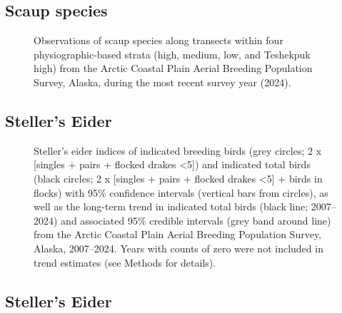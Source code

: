 \documentclass[
]{article}
\begin{document}
\endgroup{}

\newpage{}

\subsection*{Scaup species}\label{scaup-species-2}

\begin{figure}


\caption{\label{fig-UNSCmap}Observations of scaup species along
transects within four physiographic-based strata (high, medium, low, and
Teshekpuk high) from the Arctic Coastal Plain Aerial Breeding Population
Survey, Alaska, during the most recent survey year (2024).}

\end{figure}%

\newpage{}

\subsection*{Steller's Eider}\label{stellers-eider}

\begin{figure}


\caption{\label{fig-STEI}Steller's eider indices of indicated breeding
birds (grey circles; 2 x {[}singles + pairs + flocked drakes
\textless5{]}) and indicated total birds (black circles; 2 x {[}singles
+ pairs + flocked drakes \textless5{]} + birds in flocks) with 95\%
confidence intervals (vertical bars from circles), as well as the
long-term trend in indicated total birds (black line; 2007--2024) and
associated 95\% credible intervals (grey band around line) from the
Arctic Coastal Plain Aerial Breeding Population Survey, Alaska,
2007--2024. Years with counts of zero were not included in trend
estimates (see Methods for details).}

\end{figure}%

\newpage{}

\subsection*{Steller's Eider}\label{stellers-eider-1}
\end{document}
